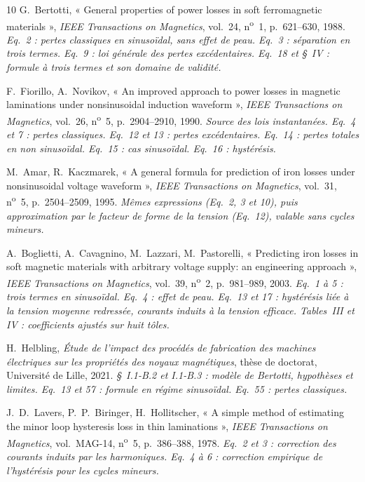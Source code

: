 \documentclass[11pt,a4paper]{article}
\begin{document}
\begin{thebibliography}{10}
 G.~Bertotti, « General properties of power losses in soft ferromagnetic materials », \emph{IEEE Transactions on Magnetics}, vol.~24, n\textsuperscript{o}~1, p.~621--630, 1988. \emph{Eq.~2 : pertes classiques en sinusoïdal, sans effet de peau. Eq.~3 : séparation en trois termes. Eq.~9 : loi générale des pertes excédentaires. Eq.~18 et \S~IV : formule à trois termes et son domaine de validité.}

 F.~Fiorillo, A.~Novikov, « An improved approach to power losses in magnetic laminations under nonsinusoidal induction waveform », \emph{IEEE Transactions on Magnetics}, vol.~26, n\textsuperscript{o}~5, p.~2904--2910, 1990. \emph{Source des lois instantanées. Eq.~4 et 7 : pertes classiques. Eq.~12 et 13 : pertes excédentaires. Eq.~14 : pertes totales en non sinusoïdal. Eq.~15 : cas sinusoïdal. Eq.~16 : hystérésis.}

 M.~Amar, R.~Kaczmarek, « A general formula for prediction of iron losses under nonsinusoidal voltage waveform », \emph{IEEE Transactions on Magnetics}, vol.~31, n\textsuperscript{o}~5, p.~2504--2509, 1995. \emph{Mêmes expressions (Eq.~2, 3 et 10), puis approximation par le facteur de forme de la tension (Eq.~12), valable sans cycles mineurs.}

 A.~Boglietti, A.~Cavagnino, M.~Lazzari, M.~Pastorelli, « Predicting iron losses in soft magnetic materials with arbitrary voltage supply: an engineering approach », \emph{IEEE Transactions on Magnetics}, vol.~39, n\textsuperscript{o}~2, p.~981--989, 2003. \emph{Eq.~1 à 5 : trois termes en sinusoïdal. Eq.~4 : effet de peau. Eq.~13 et 17 : hystérésis liée à la tension moyenne redressée, courants induits à la tension efficace. Tables~III et IV : coefficients ajustés sur huit tôles.}

 H.~Helbling, \emph{Étude de l'impact des procédés de fabrication des machines électriques sur les propriétés des noyaux magnétiques}, thèse de doctorat, Université de Lille, 2021. \emph{\S~I.1-B.2 et I.1-B.3 : modèle de Bertotti, hypothèses et limites. Eq.~13 et 57 : formule en régime sinusoïdal. Eq.~55 : pertes classiques.}

 J.~D.~Lavers, P.~P.~Biringer, H.~Hollitscher, « A simple method of estimating the minor loop hysteresis loss in thin laminations », \emph{IEEE Transactions on Magnetics}, vol.~MAG-14, n\textsuperscript{o}~5, p.~386--388, 1978. \emph{Eq.~2 et 3 : correction des courants induits par les harmoniques. Eq.~4 à 6 : correction empirique de l'hystérésis pour les cycles mineurs.}


\end{thebibliography}
\end{document}

